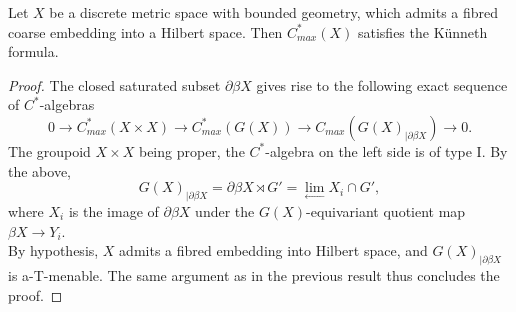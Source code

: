 \begin{satz}
		Let $X$ be a discrete metric space with bounded geometry, which admits a fibred coarse embedding into a Hilbert space. Then $C_{max}^*(X)$ satisfies the Künneth formula.
\end{satz}
\begin{proof}
The closed saturated subset $\partial \beta X$ gives rise to the following exact sequence of $C^*$-algebras
\[0 \rightarrow C_{max}^*(X\times X) \rightarrow C^*_{max}(G(X)) \rightarrow C_{max}(G(X)_{|\partial \beta X}) \rightarrow 0.\] 
The groupoid $X\times X$ being proper, the $C^*$-algebra on the left side is of type I. By the above, 
\[G(X)_{|\partial \beta X} = \partial \beta X \rtimes G' =\lim\limits_{\longleftarrow} X_i\cap G', \]
where $X_i$ is the image of $\partial \beta X$ under the $G(X)$-equivariant quotient map $\beta X \rightarrow Y_i$.\\

By hypothesis, $X$ admits a fibred embedding into Hilbert space, and $G(X)_{|\partial \beta X}$ is a-T-menable. The same argument as in the previous result thus concludes the proof.
\end{proof}